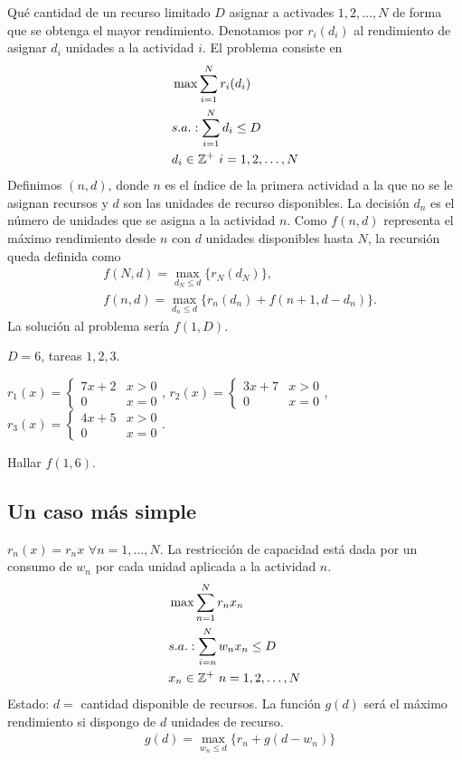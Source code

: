 \documentclass[MIOP.tex]{subfiles}
\begin{document}
\begin{ej} 
Qué cantidad de un recurso limitado $D$ asignar a activades $1,2,\dots, N$ de forma que se obtenga el mayor rendimiento. Denotamos por $r_i(d_i)$ al rendimiento de asignar $d_i$ unidades a la actividad $i$. El problema consiste en 
\begin{align*}
&\max \sum_{i=1}^N r_i(d_i)\\
&s.a.: \sum_{i=1}^N d_i\leq D\\
&      d_i\in\mathbb{Z}^+\ i=1,2,\dots,N
\end{align*}
Definimos $(n,d)$, donde $n$ es el índice de la primera actividad a la que no se le asignan recursos y $d$ son las unidades de recurso disponibles. La decisión $d_n$ es el número de unidades que se asigna a la actividad $n$. Como $f(n,d)$ representa el máximo rendimiento desde $n$ con $d$ unidades disponibles hasta $N$, la recursión queda definida como
\begin{align*}
&f(N,d)=\max_{d_N\leq d}\{r_N(d_N)\},\\
&f(n,d)=\max_{d_n\leq d}\{r_n(d_n)+f(n+1,d-d_n)\}.
\end{align*}
La solución al problema sería $f(1,D)$.
\end{ej}
\begin{ej} $D=6$, tareas $1,2,3$.

$r_1(x)=\begin{cases}
7x+2 & x>0\\
0 & x=0
\end{cases}$, $r_2(x)=\begin{cases}
3x+7 & x>0\\
0 & x=0
\end{cases}$, $r_3(x)=\begin{cases}
4x+5 & x>0\\
0 & x=0
\end{cases}.$

Hallar $f(1,6)$.


\end{ej}

\subsection{Un caso más simple}

$r_n(x)=r_nx$ $\forall n=1,\dots, N$. La restricción de capacidad está dada por un consumo de $w_n$ por cada unidad aplicada a la actividad $n$. 
\begin{align*}
&\max \sum_{n=1}^N r_nx_n\\
&s.a.: \sum_{i=n}^N w_nx_n\leq D\\
&      x_n\in\mathbb{Z}^+\ n=1,2,\dots,N
\end{align*}
Estado: $d=$ cantidad disponible de recursos. La función $g(d)$ será el máximo rendimiento si dispongo de $d$ unidades de recurso. 
\begin{align*}
&g(d)=\max_{w_n\leq d}\{r_n+g(d-w_n)\}
\end{align*}
\end{document}
